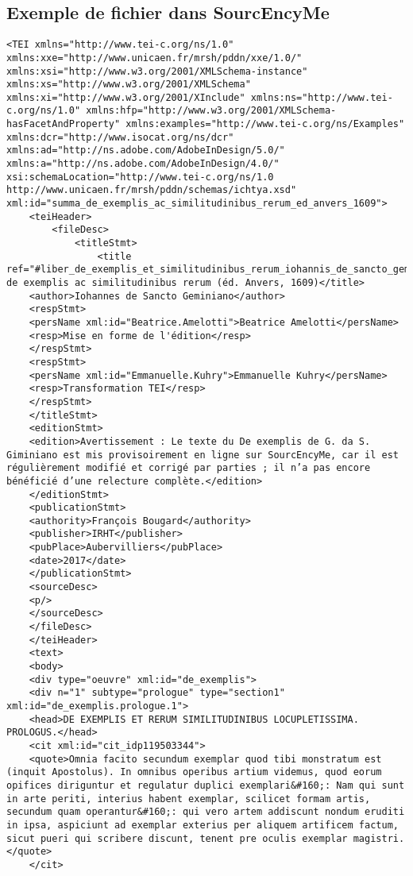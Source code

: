 \subsection{Exemple de fichier  dans SourcEncyMe}

\begin{lstlisting}[breaklines=true]
<TEI xmlns="http://www.tei-c.org/ns/1.0" xmlns:xxe="http://www.unicaen.fr/mrsh/pddn/xxe/1.0/" xmlns:xsi="http://www.w3.org/2001/XMLSchema-instance" xmlns:xs="http://www.w3.org/2001/XMLSchema" xmlns:xi="http://www.w3.org/2001/XInclude" xmlns:ns="http://www.tei-c.org/ns/1.0" xmlns:hfp="http://www.w3.org/2001/XMLSchema-hasFacetAndProperty" xmlns:examples="http://www.tei-c.org/ns/Examples" xmlns:dcr="http://www.isocat.org/ns/dcr" xmlns:ad="http://ns.adobe.com/AdobeInDesign/5.0/" xmlns:a="http://ns.adobe.com/AdobeInDesign/4.0/" xsi:schemaLocation="http://www.tei-c.org/ns/1.0 http://www.unicaen.fr/mrsh/pddn/schemas/ichtya.xsd" xml:id="summa_de_exemplis_ac_similitudinibus_rerum_ed_anvers_1609">
	<teiHeader>
		<fileDesc>
			<titleStmt>
				<title ref="#liber_de_exemplis_et_similitudinibus_rerum_iohannis_de_sancto_geminiano">Summa de exemplis ac similitudinibus rerum (éd. Anvers, 1609)</title>
	<author>Iohannes de Sancto Geminiano</author>
	<respStmt>
	<persName xml:id="Beatrice.Amelotti">Beatrice Amelotti</persName>
	<resp>Mise en forme de l'édition</resp>
	</respStmt>
	<respStmt>
	<persName xml:id="Emmanuelle.Kuhry">Emmanuelle Kuhry</persName>
	<resp>Transformation TEI</resp>
	</respStmt>
	</titleStmt>
	<editionStmt>
	<edition>Avertissement : Le texte du De exemplis de G. da S. Giminiano est mis provisoirement en ligne sur SourcEncyMe, car il est régulièrement modifié et corrigé par parties ; il n’a pas encore bénéficié d’une relecture complète.</edition>
	</editionStmt>
	<publicationStmt>
	<authority>François Bougard</authority>
	<publisher>IRHT</publisher>
	<pubPlace>Aubervilliers</pubPlace>
	<date>2017</date>
	</publicationStmt>
	<sourceDesc>
	<p/>
	</sourceDesc>
	</fileDesc>
	</teiHeader>
	<text>
	<body>
	<div type="oeuvre" xml:id="de_exemplis">
	<div n="1" subtype="prologue" type="section1" xml:id="de_exemplis.prologue.1">
	<head>DE EXEMPLIS ET RERUM SIMILITUDINIBUS LOCUPLETISSIMA. PROLOGUS.</head>
	<cit xml:id="cit_idp119503344">
	<quote>Omnia facito secundum exemplar quod tibi monstratum est (inquit Apostolus). In omnibus operibus artium videmus, quod eorum opifices diriguntur et regulatur duplici exemplari&#160;: Nam qui sunt in arte periti, interius habent exemplar, scilicet formam artis, secundum quam operantur&#160;: qui vero artem addiscunt nondum eruditi in ipsa, aspiciunt ad exemplar exterius per aliquem artificem factum, sicut pueri qui scribere discunt, tenent pre oculis exemplar magistri.</quote>
	</cit>
\end{lstlisting}